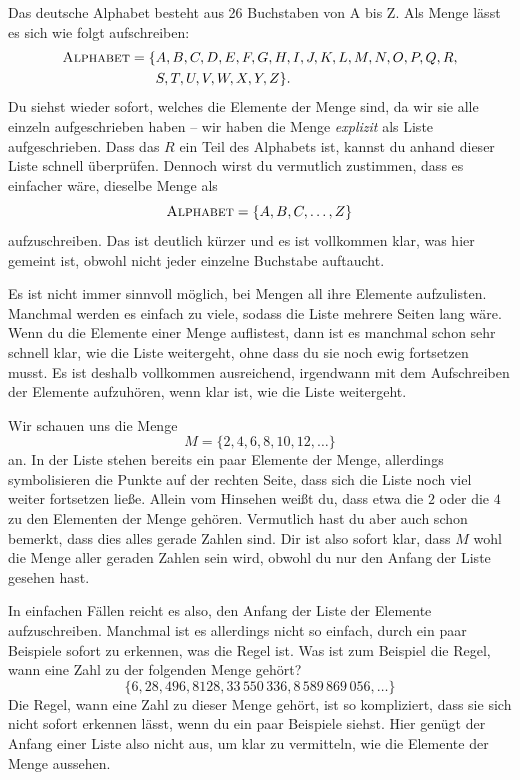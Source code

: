 \documentclass[../../main.tex]{subfiles}
\begin{document}
\begin{example}[ex:alphabet]{}
    Das deutsche Alphabet besteht aus 26 Buchstaben von A bis Z. Als Menge lässt es sich wie folgt aufschreiben:
    \begin{align*}
        \textsc{Alphabet}=\{&A,B,C,D,E,F,G,H,I,J,K,L,M,N,O,P,Q,R,\\
        &S,T,U,V,W,X,Y,Z\}.
    \end{align*}
    Du siehst wieder sofort, welches die Elemente der Menge sind, da wir sie alle einzeln aufgeschrieben haben -- wir haben die Menge \emph{explizit} als Liste aufgeschrieben. Dass das $R$ ein Teil des Alphabets ist, kannst du anhand dieser Liste schnell überprüfen. Dennoch wirst du vermutlich zustimmen, dass es einfacher wäre, dieselbe Menge als
    \[\textsc{Alphabet}=\{A,B,C,\dots,Z\}\]
    aufzuschreiben. Das ist deutlich kürzer und es ist vollkommen klar, was hier gemeint ist, obwohl nicht jeder einzelne Buchstabe auftaucht.
\end{example}

Es ist nicht immer sinnvoll möglich, bei Mengen all ihre Elemente aufzulisten. Manchmal werden es einfach zu viele, sodass die Liste mehrere Seiten lang wäre. Wenn du die Elemente einer Menge auflistest, dann ist es manchmal schon sehr schnell klar, wie die Liste weitergeht, ohne dass du sie noch ewig fortsetzen musst. Es ist deshalb vollkommen ausreichend, irgendwann mit dem Aufschreiben der Elemente aufzuhören, wenn klar ist, wie die Liste weitergeht.

\begin{example}{}
    Wir schauen uns die Menge
    \[M=\{2,4,6,8,10,12,\dots\}\]
    an. In der Liste stehen bereits ein paar Elemente der Menge, allerdings symbolisieren die Punkte auf der rechten Seite, dass sich die Liste noch viel weiter fortsetzen ließe. Allein vom Hinsehen weißt du, dass etwa die $2$ oder die $4$ zu den Elementen der Menge gehören. Vermutlich hast du aber auch schon bemerkt, dass dies alles gerade Zahlen sind. Dir ist also sofort klar, dass $M$ wohl die Menge aller geraden Zahlen sein wird, obwohl du nur den Anfang der Liste gesehen hast.
\end{example}

In einfachen Fällen reicht es also, den Anfang der Liste der Elemente aufzuschreiben. Manchmal ist es allerdings nicht so einfach, durch ein paar Beispiele sofort zu erkennen, was die Regel ist. Was ist zum Beispiel die Regel, wann eine Zahl zu der folgenden Menge gehört?
\[\{6,28,496,8128,33\,550\,336,8\,589\,869\,056,\dots\}\]
Die Regel, wann eine Zahl zu dieser Menge gehört, ist so kompliziert, dass sie sich nicht sofort erkennen lässt, wenn du ein paar Beispiele siehst. Hier genügt der Anfang einer Liste also nicht aus, um klar zu vermitteln, wie die Elemente der Menge aussehen.
\end{document}
